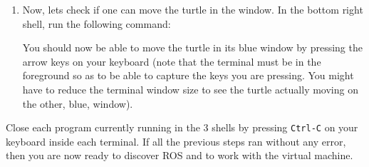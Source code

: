 \documentclass[10pt,a4paper,printanswers]{upmc}
\begin{document}
\begin{enumerate}
  \item Now, lets check if one can move the turtle in the window. In the bottom right shell, run
        the following command:
        

        You should now be able to move the turtle in its blue window by pressing the arrow keys on
        your keyboard (note that the terminal must be in the foreground so as to be able to capture
        the keys you are pressing. You might have to reduce the terminal window size to see the
        turtle actually moving on the other, blue, window).

\end{enumerate}

Close each program currently running in the 3 shells by pressing \texttt{Ctrl-C} on your keyboard
inside each terminal. If all the previous steps ran without any error, then you are now ready to
discover ROS and to work with the virtual machine.

\newpage
\end{document}
